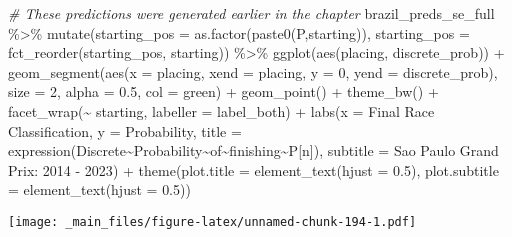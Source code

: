 \documentclass[
]{book}
\newenvironment{Shaded}{\begin{snugshade}}{\end{snugshade}}
\newcommand{\AttributeTok}[1]{\textcolor[rgb]{0.77,0.63,0.00}{#1}}
\newcommand{\CommentTok}[1]{\textcolor[rgb]{0.56,0.35,0.01}{\textit{#1}}}
\newcommand{\DecValTok}[1]{\textcolor[rgb]{0.00,0.00,0.81}{#1}}
\newcommand{\FloatTok}[1]{\textcolor[rgb]{0.00,0.00,0.81}{#1}}
\newcommand{\FunctionTok}[1]{\textcolor[rgb]{0.00,0.00,0.00}{#1}}
\newcommand{\NormalTok}[1]{#1}
\newcommand{\SpecialCharTok}[1]{\textcolor[rgb]{0.00,0.00,0.00}{#1}}
\newcommand{\StringTok}[1]{\textcolor[rgb]{0.31,0.60,0.02}{#1}}
\begin{document}
\begin{Shaded}
\begin{Highlighting}[]
\CommentTok{\# These predictions were generated earlier in the chapter}
\NormalTok{brazil\_preds\_se\_full }\SpecialCharTok{\%\textgreater{}\%}
  \FunctionTok{mutate}\NormalTok{(}\AttributeTok{starting\_pos =} \FunctionTok{as.factor}\NormalTok{(}\FunctionTok{paste0}\NormalTok{(}\StringTok{\textquotesingle{}P\textquotesingle{}}\NormalTok{,starting)),}
         \AttributeTok{starting\_pos =} \FunctionTok{fct\_reorder}\NormalTok{(starting\_pos, starting)) }\SpecialCharTok{\%\textgreater{}\%}
  \FunctionTok{ggplot}\NormalTok{(}\FunctionTok{aes}\NormalTok{(placing, discrete\_prob)) }\SpecialCharTok{+}
  \FunctionTok{geom\_segment}\NormalTok{(}\FunctionTok{aes}\NormalTok{(}\AttributeTok{x =}\NormalTok{ placing, }\AttributeTok{xend =}\NormalTok{ placing, }\AttributeTok{y =} \DecValTok{0}\NormalTok{, }\AttributeTok{yend =}\NormalTok{ discrete\_prob),}
               \AttributeTok{size =} \DecValTok{2}\NormalTok{, }\AttributeTok{alpha =} \FloatTok{0.5}\NormalTok{, }\AttributeTok{col =} \StringTok{\textquotesingle{}green\textquotesingle{}}\NormalTok{) }\SpecialCharTok{+}
  \FunctionTok{geom\_point}\NormalTok{() }\SpecialCharTok{+}
  \FunctionTok{theme\_bw}\NormalTok{() }\SpecialCharTok{+}
  \FunctionTok{facet\_wrap}\NormalTok{(}\SpecialCharTok{\textasciitilde{}}\NormalTok{ starting, }\AttributeTok{labeller =}\NormalTok{ label\_both) }\SpecialCharTok{+}
  \FunctionTok{labs}\NormalTok{(}\AttributeTok{x =} \StringTok{\textquotesingle{}Final Race Classification\textquotesingle{}}\NormalTok{,}
       \AttributeTok{y =} \StringTok{\textquotesingle{}Probability\textquotesingle{}}\NormalTok{,}
       \AttributeTok{title =} \FunctionTok{expression}\NormalTok{(Discrete}\SpecialCharTok{\textasciitilde{}}\NormalTok{Probability}\SpecialCharTok{\textasciitilde{}}\NormalTok{of}\SpecialCharTok{\textasciitilde{}}\NormalTok{finishing}\SpecialCharTok{\textasciitilde{}}\NormalTok{P[n]),}
       \AttributeTok{subtitle =} \StringTok{\textquotesingle{}Sao Paulo Grand Prix: 2014 {-} 2023\textquotesingle{}}\NormalTok{) }\SpecialCharTok{+}
  \FunctionTok{theme}\NormalTok{(}\AttributeTok{plot.title =} \FunctionTok{element\_text}\NormalTok{(}\AttributeTok{hjust =} \FloatTok{0.5}\NormalTok{),}
        \AttributeTok{plot.subtitle =} \FunctionTok{element\_text}\NormalTok{(}\AttributeTok{hjust =} \FloatTok{0.5}\NormalTok{)) }
\end{Highlighting}
\end{Shaded}

\texttt{[image: \_main\_files/figure-latex/unnamed-chunk-194-1.pdf]}
\end{document}
